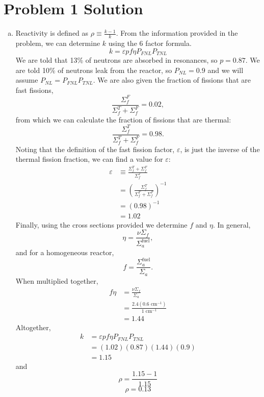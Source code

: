 \section*{Problem 1 Solution}

\begin{enumerate}[a)]

\item Reactivity is defined as $\rho \equiv \frac{k - 1}{k}$. From the information provided in the problem, we can determine $k$ using the 6 factor formula. 
$$ k = \varepsilon p f \eta P_{\textit{FNL}} P_{\textit{TNL}} $$
We are told that 13\% of neutrons are absorbed in resonances, so $p = 0.87$. We are told 10\% of neutrons leak from the reactor, so $P_{\textit{NL}} = 0.9$ and we will assume $P_{\textit{NL}} = P_{\textit{FNL}} P_{\textit{TNL}}$. We are also given the fraction of fissions that are fast fissions,
$$ \frac{\Sigma_f^F}{\Sigma_f^T + \Sigma_f^F} = 0.02 ,$$
from which we can calculate the fraction of fissions that are thermal:
$$ \frac{\Sigma_f^T}{\Sigma_f^T + \Sigma_f^F} = 0.98 .$$
Noting that the definition of the fast fission factor, $\varepsilon$, is just the inverse of the thermal fission fraction, we can find a value for $\varepsilon$:
\begin{align*}
\varepsilon	&\equiv \frac{\Sigma_f^T + \Sigma_f^F}{\Sigma_f^T} \\
			&= \left(\frac{\Sigma_f^T}{\Sigma_f^T + \Sigma_f^F}\right)^{-1} \\
			&= \left(0.98\right)^{-1} \\
			&= 1.02 
\end{align*}
Finally, using the cross sections provided we determine $f$ and $\eta$. In general,
$$ \eta = \frac{\nu\Sigma_f}{\Sigma_a^{\text{fuel}}} ,$$
and for a homogeneous reactor, 
$$ f = \frac{\Sigma_a^{\text{fuel}}}{\Sigma_a} .$$
When multiplied together,
\begin{align*}
f \eta	&= \frac{\nu\Sigma_f}{\Sigma_a} \\
		&= \frac{2.4\left(0.6\text{ cm}^{-1}\right)}{1\text{ cm}^{-1}} \\
		&= 1.44
\end{align*}
Altogether,
\begin{align*}
k	&= \varepsilon p f \eta P_{\textit{FNL}} P_{\textit{TNL}} \\
	&= \left(1.02\right)\left(0.87\right)\left(1.44\right)\left(0.9\right) \\
	&= 1.15
\end{align*}
and
$$ \rho = \frac{1.15-1}{1.15} $$
$$\boxed{ \rho = 0.13 }$$


\end{enumerate}
